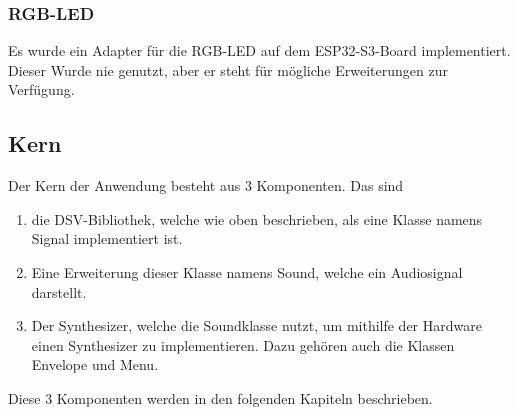 \subsubsection{RGB-LED}
Es wurde ein Adapter für die  RGB-LED auf dem ESP32-S3-Board implementiert.
Dieser Wurde nie genutzt, aber er steht für mögliche Erweiterungen zur Verfügung.

\subsection{Kern}

Der Kern der Anwendung besteht aus 3 Komponenten. Das sind
\begin{enumerate}
    \item die DSV-Bibliothek, welche
            wie oben beschrieben, als eine Klasse namens Signal implementiert ist.
    \item Eine 
            Erweiterung dieser Klasse namens Sound, welche ein Audiosignal darstellt.
    \item Der Synthesizer, welche die Soundklasse nutzt, um mithilfe der 
        Hardware einen Synthesizer zu implementieren. 
        Dazu gehören auch die Klassen Envelope und Menu.
\end{enumerate}
Diese 3 Komponenten werden in den folgenden Kapiteln beschrieben.